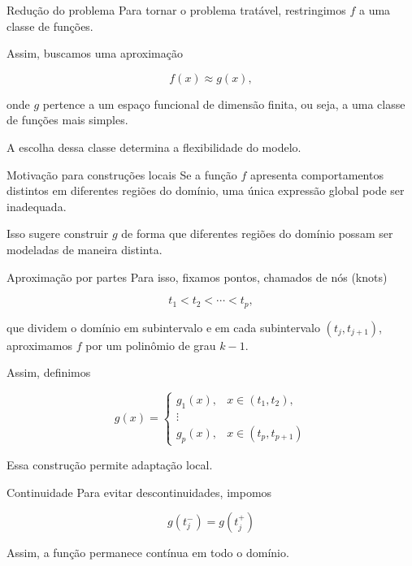 \documentclass[
  ignorenonframetext,
  aspectratio=169,
]{beamer}
\begin{document}
\begin{frame}
\begin{block}{Redução do problema}
\label{reduuxe7uxe3o-do-problema}
Para tornar o problema tratável, restringimos \(f\) a uma classe de
funções.

Assim, buscamos uma aproximação

\[
f(x) \approx g(x),
\]

onde \(g\) pertence a um espaço funcional de dimensão finita, ou seja, a
uma classe de funções mais simples.

A escolha dessa classe determina a flexibilidade do modelo.
\end{block}
\end{frame}

\begin{frame}
\begin{block}{Motivação para construções locais}
\label{motivauxe7uxe3o-para-construuxe7uxf5es-locais}
Se a função \(f\) apresenta comportamentos distintos em diferentes
regiões do domínio, uma única expressão global pode ser inadequada.

Isso sugere construir \(g\) de forma que diferentes regiões do domínio
possam ser modeladas de maneira distinta.
\end{block}
\end{frame}

\begin{frame}
\begin{block}{Aproximação por partes}
\label{aproximauxe7uxe3o-por-partes}
Para isso, fixamos pontos, chamados de nós (knots)

\[
t_1 < t_2 < \cdots < t_p,
\]

que dividem o domínio em subintervalo e em cada subintervalo
\((t_j, t_{j+1})\), aproximamos \(f\) por um polinômio de grau \(k-1\).

Assim, definimos

\[
g(x) =
\begin{cases}
g_1(x), & x \in (t_1,t_2), \\
\vdots \\
g_p(x), & x \in (t_p,t_{p+1})
\end{cases}
\]

Essa construção permite adaptação local.
\end{block}
\end{frame}

\begin{frame}
\begin{block}{Continuidade}
\label{continuidade}
Para evitar descontinuidades, impomos

\[
g(t_j^-) = g(t_j^+)
\]

Assim, a função permanece contínua em todo o domínio.
\end{block}
\end{frame}
\end{document}
